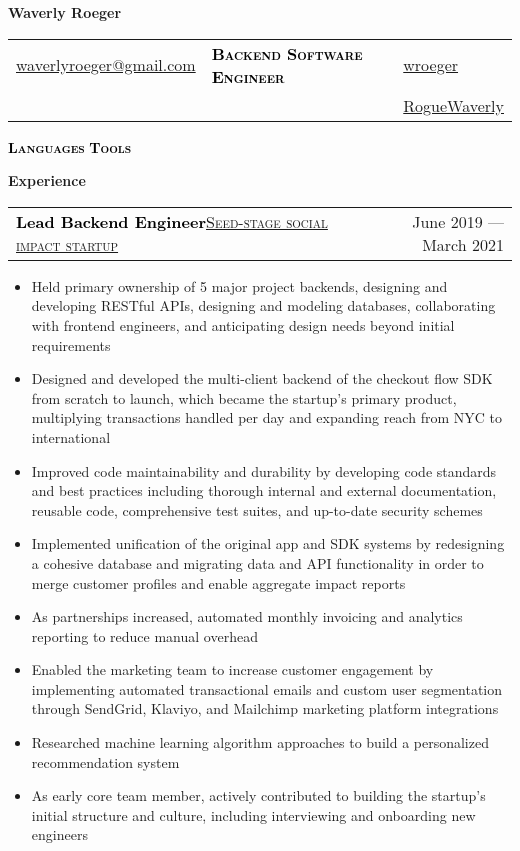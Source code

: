 \documentclass[letterpaper,11pt]{article}
\makeatletter
\newcommand{\boldsc}[1]{\textcolor{black}{\textbf{\textsc{#1}}}}
\newcommand{\resumeSpacing}{5pt}
\newcommand{\name}{Waverly Roeger}
\newcommand{\position}{Backend Software Engineer}
\newcommand{\addr}{\textcolor{black}{\faMapMarker}\space{New York City area (Stamford, CT)}}
\newcommand{\phone}{\textcolor{black}{\faPhone}\space{(806) 239-6854}}
\newcommand{\email}{\textcolor{black}{\faEnvelopeO}\space\href{mailto:waverlyroeger@gmail.com}{waverlyroeger@gmail.com}}
\newcommand{\linkedin}{\textcolor{black}{\faLinkedin}\space\href{https://www.linkedin.com/in/wroeger}{wroeger}}
\newcommand{\github}{\textcolor{black}{\faGithub}\space\href{https://github.com/RogueWaverly}{RogueWaverly}}
\newcommand{\resumeSection}[1]{
  \begin{flushleft}
  {\LARGE
  \textcolor{accent}{\textbf{#1}}
  \hrulefill}
  \end{flushleft}
}
\newcommand{\resumeSubsection}[5]{
  \begin{center}
	\begin{tabular*}{\textwidth}{l@{\extracolsep{\fill}}r}
	\large\textcolor{black}{\textbf{#1}}\normalsize\textcolor{black}{\quad\href{#4}{\textsc{#3}}\textit{#5}} & \small\textcolor{accent}{#2} \\
	\end{tabular*}
  \vspace{-\resumeSpacing}
  \vspace{-\resumeSpacing}
  \end{center}
}
\newenvironment{resumeItemize}{
  \addtolength{\leftmargini}{-\resumeSpacing}
  \begin{minipage}{0.99\textwidth}
  \begin{itemize}
  \small
}{
  \end{itemize}
  \vspace{0pt}
  \end{minipage}
  \normalsize
  \ \\
}
\newcommand{\resumeItem}[1]
{
  \raggedright
  \item{#1}
  \vspace{-\resumeSpacing}
}
\makeatother
\begin{document}
  \color{darkgray}
	\begin{center}\Huge{\color{black}\textbf{\name}}\end{center}
  \begin{center}
    \small
    {\setlength{\extrarowheight}{3pt}
    \begin{tabular*}{\textwidth}{L{0.25\textwidth}C{0.43\textwidth}R{0.25\textwidth}}
      \email & {\normalsize{\boldsc{\textcolor{accent}{\position}}}} & \linkedin \\
      \phone & \addr & \github \\
    \end{tabular*}}
  \end{center}
  \begin{center}
    \boldsc{Languages}{\small{}\quad}
    \boldsc{Tools}{\small{}}
  \end{center}
  \resumeSection{Experience}
  \resumeSubsection
  {Lead Backend Engineer}{June 2019 --- March 2021}
  {Seed-stage social impact startup}{}{}
  \begin{resumeItemize}
    \resumeItem
    {Held primary ownership of 5 major project backends, designing and developing RESTful APIs, designing and modeling databases, collaborating with frontend engineers, and anticipating design needs beyond initial requirements}
    \resumeItem
    {Designed and developed the multi-client backend of the checkout flow SDK from scratch to launch, which became the startup's primary product, multiplying transactions handled per day and expanding reach from NYC to international}
    \resumeItem
    {Improved code maintainability and durability by developing code standards and best practices including thorough internal and external documentation, reusable code, comprehensive test suites, and up-to-date security schemes}
    \resumeItem
    {Implemented unification of the original app and SDK systems by redesigning a cohesive database and migrating data and API functionality in order to merge customer profiles and enable aggregate impact reports}
    \resumeItem
    {As partnerships increased, automated monthly invoicing and analytics reporting to reduce manual overhead}
    \resumeItem
    {Enabled the marketing team to increase customer engagement by implementing automated transactional emails and custom user segmentation through SendGrid, Klaviyo, and Mailchimp marketing platform integrations}
    \resumeItem
    {Researched machine learning algorithm approaches to build a personalized recommendation system}
    \resumeItem
    {As early core team member, actively contributed to building the startup's initial structure and culture, including interviewing and onboarding new engineers}
  \end{resumeItemize}
\end{document}
